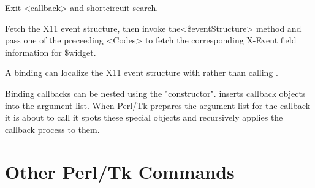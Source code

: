 \begin{enum}{1cm}

Exit <callback> and shortcircuit  search.

Fetch the X11 event structure, then
invoke the<\$eventStructure> method and pass one of the preceeding
<Codes> to fetch the corresponding X-Event field information for \$widget.

A binding can localize the X11 event structure with 
rather than calling . 

Binding callbacks can be nested using the  "constructor". 
inserts callback objects into the argument list. When Perl/Tk prepares the argument
list for the callback it is about to call it spots these special
objects and recursively applies the callback process to them. 
 
\end{enum}


\section{Other Perl/Tk Commands}

